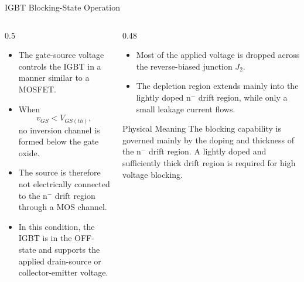 \begin{frame}{IGBT Blocking-State Operation}
\begin{columns}
\begin{column}{0.5\textwidth}
\begin{itemize}
    \item The gate-source voltage controls the IGBT in a manner similar to a MOSFET.
    \item When
    \[
    v_{GS} < V_{GS(th)},
    \]
    no inversion channel is formed below the gate oxide.
    \item The source is therefore not electrically connected to the n$^-$ drift region through a MOS channel.
    \item In this condition, the IGBT is in the OFF-state and supports the applied drain-source or collector-emitter voltage.
\end{itemize}
\end{column}

\begin{column}{0.48\textwidth}
\begin{itemize}
    \item Most of the applied voltage is dropped across the reverse-biased junction $J_2$.
    \item The depletion region extends mainly into the lightly doped n$^-$ drift region, while only a small leakage current flows.
\end{itemize}
\begin{block}{Physical Meaning}
The blocking capability is governed mainly by the doping and thickness of the n$^-$ drift region. A lightly doped and sufficiently thick drift region is required for high voltage blocking.
\end{block}
\end{column}
\end{columns}
\end{frame}


